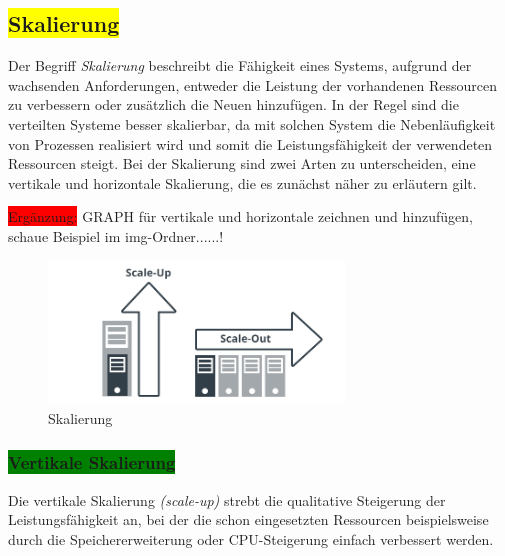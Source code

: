 \subsection{\colorbox{yellow}{Skalierung}}\label{scale}

Der Begriff \textit{Skalierung} beschreibt die Fähigkeit eines Systems,  aufgrund der wachsenden Anforderungen, entweder die Leistung der vorhandenen Ressourcen zu verbessern oder zusätzlich die Neuen hinzufügen. In der Regel sind die verteilten Systeme besser skalierbar, da mit solchen System die Nebenläufigkeit von Prozessen realisiert wird und somit die Leistungsfähigkeit der verwendeten Ressourcen steigt.
Bei der Skalierung sind zwei Arten zu unterscheiden, eine vertikale und horizontale Skalierung, die es zunächst näher zu erläutern gilt.

\colorbox{red}{Ergänzung:} GRAPH für vertikale und horizontale zeichnen und hinzufügen, schaue Beispiel im img-Ordner......!

\begin{figure}[H]
\centering
\includegraphics[width=0.7\textwidth]{resources/scales}
\caption[Skalierung]{Skalierung\protect\footnotemark}
\label{img:scales}
\end{figure}

\subsubsection{\colorbox{green}{Vertikale Skalierung}}

Die vertikale Skalierung \textit{(scale-up)} strebt die qualitative Steigerung der Leistungsfähigkeit an, bei der die schon eingesetzten Ressourcen beispielsweise durch die Speichererweiterung oder CPU-Steigerung einfach verbessert werden.

